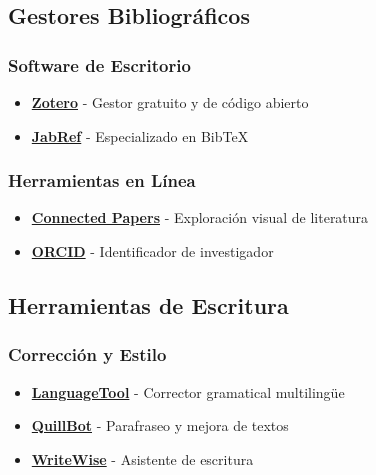 \documentclass[
  jou,
  floatsintext,
  longtable,
  a4paper,
  nolmodern,
  notxfonts,
  notimes,
  12pt,
  colorlinks=true,linkcolor=blue,citecolor=blue,urlcolor=blue]{apa7}
\providecommand{\tightlist}{%
  \setlength{\itemsep}{0pt}\setlength{\parskip}{0pt}}
\begin{document}
\subsection{Gestores Bibliográficos}\label{gestores-bibliogruxe1ficos}

\subsubsection{Software de Escritorio}\label{software-de-escritorio}

\begin{itemize}
\tightlist
\item
  \textbf{\href{https://www.zotero.org/}{Zotero}} - Gestor gratuito y de
  código abierto
\item
  \textbf{\href{https://www.jabref.org/}{JabRef}} - Especializado en
  BibTeX
\end{itemize}

\subsubsection{Herramientas en Línea}\label{herramientas-en-luxednea}

\begin{itemize}
\tightlist
\item
  \textbf{\href{https://www.connectedpapers.com/}{Connected Papers}} -
  Exploración visual de literatura
\item
  \textbf{\href{https://orcid.org/}{ORCID}} - Identificador de
  investigador
\end{itemize}

\subsection{Herramientas de Escritura}\label{herramientas-de-escritura}

\subsubsection{Corrección y Estilo}\label{correcciuxf3n-y-estilo}

\begin{itemize}
\tightlist
\item
  \textbf{\href{https://languagetool.org/}{LanguageTool}} - Corrector
  gramatical multilingüe
\item
  \textbf{\href{https://quillbot.com/}{QuillBot}} - Parafraseo y mejora
  de textos
\item
  \textbf{\href{https://web.writewise.io/?nab=5}{WriteWise}} - Asistente
  de escritura
\end{itemize}
\end{document}
